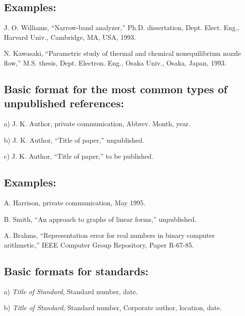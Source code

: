 \subsection*{Examples:}

\begin{thebibliography}{34}
\setcounter{enumiv}{24}

\bibitem{}J. O. Williams, ``Narrow-band analyzer,'' Ph.D. dissertation, Dept. Elect. Eng., Harvard Univ., Cambridge, MA, USA, 1993.

\bibitem{}N. Kawasaki, ``Parametric study of thermal and chemical nonequilibrium nozzle flow,'' M.S. thesis, Dept. Electron. Eng., Osaka Univ., Osaka, Japan, 1993.
\end{thebibliography}

\subsection*{Basic format for the most common types of unpublished references:}

a) J. K. Author, private communication, Abbrev. Month, year.

b) J. K. Author, ``Title of paper,'' unpublished.

c) J. K. Author, ``Title of paper,'' to be published.

\subsection*{Examples:}

\begin{thebibliography}{34}
\setcounter{enumiv}{26}

\bibitem{}A. Harrison, private communication, May 1995.

\bibitem{}B. Smith, ``An approach to graphs of linear forms,'' unpublished.

\bibitem{}A. Brahms, ``Representation error for real numbers in binary computer arithmetic,'' IEEE Computer Group Repository, Paper R-67-85.
\end{thebibliography}

\subsection*{Basic formats for standards:}

a) {\em Title of Standard}, Standard number, date.

b) {\em Title of Standard}, Standard number, Corporate author, location, date.

